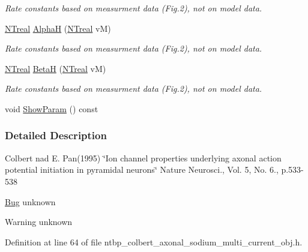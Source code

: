 \begin{DoxyCompactItemize}
\begin{DoxyCompactList}\small\item\em Rate constants based on measurment data (Fig.2), not on model data. \item\end{DoxyCompactList}\item 
\hyperlink{nt__types_8h_a814a97893e9deb1eedcc7604529ba80d}{NTreal} \hyperlink{class_n_t_b_p__colbert__axonal__sodium__multi__current__o_a742a3c1be23b22eb3c3604460172ffd3}{AlphaH} (\hyperlink{nt__types_8h_a814a97893e9deb1eedcc7604529ba80d}{NTreal} vM)
\begin{DoxyCompactList}\small\item\em Rate constants based on measurment data (Fig.2), not on model data. \item\end{DoxyCompactList}\item 
\hyperlink{nt__types_8h_a814a97893e9deb1eedcc7604529ba80d}{NTreal} \hyperlink{class_n_t_b_p__colbert__axonal__sodium__multi__current__o_a7f115e19ecb318338ea1c3d1e71f1d2a}{BetaH} (\hyperlink{nt__types_8h_a814a97893e9deb1eedcc7604529ba80d}{NTreal} vM)
\begin{DoxyCompactList}\small\item\em Rate constants based on measurment data (Fig.2), not on model data. \item\end{DoxyCompactList}\item 
void \hyperlink{class_n_t_b_p__colbert__axonal__sodium__multi__current__o_a8a296ae6ce7e14f5cb895defa2a25af3}{ShowParam} () const 
\end{DoxyCompactItemize}


\subsubsection{Detailed Description}
Colbert nad E. Pan(1995) \char`\"{}Ion channel properties underlying axonal action
potential initiation in pyramidal neurons\char`\"{} Nature Neurosci., Vol. 5, No. 6., p.533-\/538

\begin{Desc}
\item[\hyperlink{bug__bug000054}{Bug}]unknown \end{Desc}
\begin{DoxyWarning}{Warning}
unknown 
\end{DoxyWarning}


Definition at line 64 of file ntbp\_\-colbert\_\-axonal\_\-sodium\_\-multi\_\-current\_\-obj.h.



